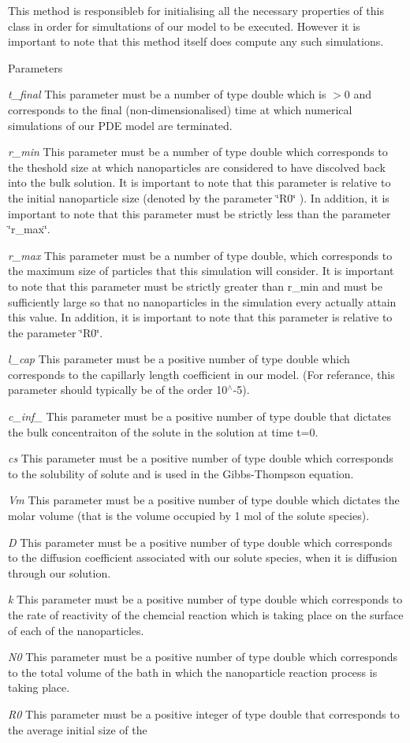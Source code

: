 This method is responsibleb for initialising all the necessary properties of this class in order for simultations of our model to be executed. However it is important to note that this method itself does compute any such simulations. 
\begin{DoxyParams}{Parameters}
\item[{\em t\_\-final}]This parameter must be a number of type double which is $>$0 and corresponds to the final (non-\/dimensionalised) time at which numerical simulations of our PDE model are terminated. \item[{\em r\_\-min}]This parameter must be a number of type double which corresponds to the theshold size at which nanoparticles are considered to have discolved back into the bulk solution. It is important to note that this parameter is relative to the initial nanoparticle size (denoted by the parameter \char`\"{}R0\char`\"{} ). In addition, it is important to note that this parameter must be strictly less than the parameter \char`\"{}r\_\-max\char`\"{}. \item[{\em r\_\-max}]This parameter must be a number of type double, which corresponds to the maximum size of particles that this simulation will consider. It is important to note that this parameter must be strictly greater than r\_\-min and must be sufficiently large so that no nanoparticles in the simulation every actually attain this value. In addition, it is important to note that this parameter is relative to the parameter \char`\"{}R0\char`\"{}. \item[{\em l\_\-cap}]This parameter must be a positive number of type double which corresponds to the capillarly length coefficient in our model. (For referance, this parameter should typically be of the order 10$^\wedge$-\/5). \item[{\em c\_\-inf\_\-0}]This parameter must be a positive number of type double that dictates the bulk concentraiton of the solute in the solution at time t=0. \item[{\em cs}]This parameter must be a positive number of type double which corresponds to the solubility of solute and is used in the Gibbs-\/Thompson equation. \item[{\em Vm}]This parameter must be a positive number of type double which dictates the molar volume (that is the volume occupied by 1 mol of the solute species). \item[{\em D}]This parameter must be a positive number of type double which corresponds to the diffusion coefficient associated with our solute species, when it is diffusion through our solution. \item[{\em k}]This parameter must be a positive number of type double which corresponds to the rate of reactivity of the chemcial reaction which is taking place on the surface of each of the nanoparticles. \item[{\em N0}]This parameter must be a positive number of type double which corresponds to the total volume of the bath in which the nanoparticle reaction process is taking place. \item[{\em R0}]This parameter must be a positive integer of type double that corresponds to the average initial size of the 
\end{DoxyParams}
